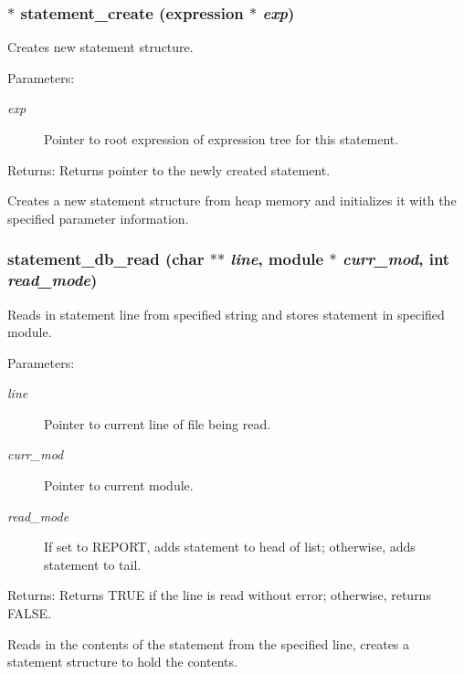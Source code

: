 \subsubsection{$\ast$ statement\_\-create ({\bf expression} $\ast$ {\em exp})}\label{statement_8h_a0}


Creates new statement structure. 

\begin{Desc}
\item[Parameters:]
\begin{description}
\item[{\em exp}]Pointer to root expression of expression tree for this statement.\end{description}
\end{Desc}
\begin{Desc}
\item[Returns:]Returns pointer to the newly created statement.\end{Desc}
Creates a new statement structure from heap memory and initializes it with the specified parameter information. 
\subsubsection{ statement\_\-db\_\-read (char $\ast$$\ast$ {\em line}, {\bf module} $\ast$ {\em curr\_\-mod}, int {\em read\_\-mode})}\label{statement_8h_a2}


Reads in statement line from specified string and stores statement in specified module. 

\begin{Desc}
\item[Parameters:]
\begin{description}
\item[{\em line}]Pointer to current line of file being read. \item[{\em curr\_\-mod}]Pointer to current module. \item[{\em read\_\-mode}]If set to REPORT, adds statement to head of list; otherwise, adds statement to tail.\end{description}
\end{Desc}
\begin{Desc}
\item[Returns:]Returns TRUE if the line is read without error; otherwise, returns FALSE.\end{Desc}
Reads in the contents of the statement from the specified line, creates a statement structure to hold the contents. 

